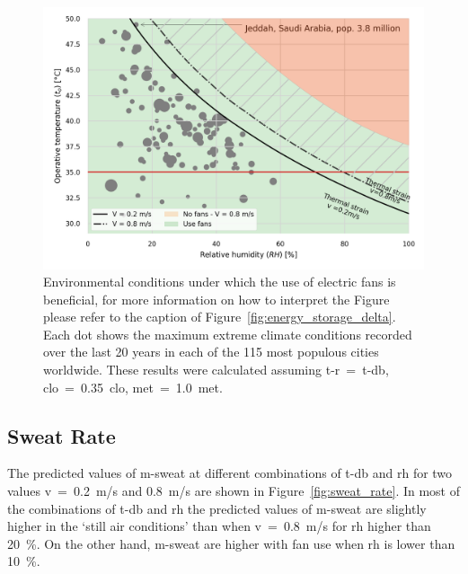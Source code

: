\begin{figure}[thb!]
    \centering
    \includegraphics[width=\textwidth]{figures/use_fans_and_population}
    \caption{Environmental conditions under which the use of electric fans is beneficial, for more information on how to interpret the Figure please refer to the caption of Figure~\ref{fig:energy_storage_delta}.
    Each dot shows the maximum extreme climate conditions recorded over the last 20 years in each of the 115 most populous cities worldwide.
    These results were calculated assuming \ac{t-r}~=~\ac{t-db}, \ac{clo}~=~0.35~clo, \ac{met}~=~1.0~met.}
    \label{fig:use_fans_and_population}
\end{figure}


\subsection{Sweat Rate}\label{subsec:sweat-rate}

The predicted values of \ac{m-sweat} at different combinations of \ac{t-db} and \ac{rh} for two values \acf{v}~=~0.2~m/s and 0.8~m/s are shown in Figure~\ref{fig:sweat_rate}.
In most of the combinations of \acf{t-db} and \acf{rh} the predicted values of \ac{m-sweat} are slightly higher in the `still air conditions' than when \ac{v}~=~0.8~m/s for \ac{rh} higher than 20~\%.
On the other hand, \ac{m-sweat} are higher with fan use when \ac{rh} is lower than 10~\%.


